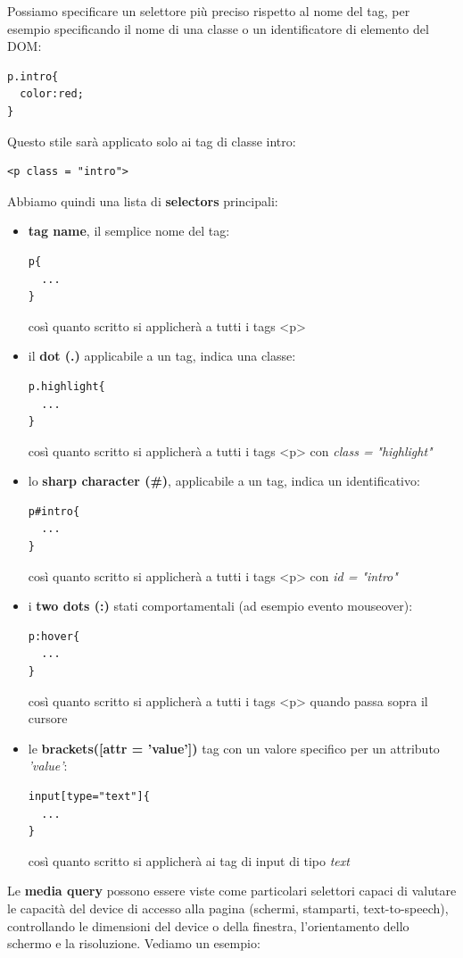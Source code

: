 \documentclass[a4paper,12pt, oneside]{book}
\begin{document}
\newpage
Possiamo specificare un selettore più preciso rispetto al
nome del tag, per esempio specificando il nome di una
classe o un identificatore di elemento del DOM:
\begin{verbatim}
p.intro{
  color:red;
}
\end{verbatim}
Questo stile sarà applicato solo ai tag di classe intro:
\begin{verbatim}
<p class = "intro">
\end{verbatim}
Abbiamo quindi una lista di \textbf{selectors} principali:
\begin{itemize}
	\item \textbf{tag name}, il semplice nome del tag:
	      \begin{verbatim}
p{
  ...
}
\end{verbatim}
	      così quanto scritto si applicherà a tutti i tags <p>
	\item il \textbf{dot (.)} applicabile a un tag, indica una classe:
	      \begin{verbatim}
p.highlight{
  ...
}
\end{verbatim}
	      così quanto scritto si applicherà a tutti i tags <p> con \textit{class =} \textit{"highlight"}
	\item lo \textbf{sharp character (\#)}, applicabile a un tag, indica un identificativo:
	      \begin{verbatim}
p#intro{
  ...
}
\end{verbatim}
	      così quanto scritto si applicherà a tutti i tags <p> con \textit{id = "intro"}
	\item i \textbf{two dots (:)} stati comportamentali (ad esempio evento mouseover):
	      \begin{verbatim}
p:hover{
  ...
}
\end{verbatim}
	      così quanto scritto si applicherà a tutti i tags <p> quando passa sopra il cursore
	\item le \textbf{brackets([attr = 'value'])} tag con un valore specifico per un attributo \textit{'value'}:
	      \begin{verbatim}
input[type="text"]{
  ...
}
\end{verbatim}
	      così quanto scritto si applicherà ai tag di input di tipo \textit{text}
\end{itemize}
Le \textbf{media query} possono essere viste come particolari selettori capaci di valutare le capacità del device di accesso alla pagina (schermi, stamparti, text-to-speech), controllando le dimensioni del device o della finestra, l'orientamento dello schermo e la risoluzione. Vediamo un esempio:\\
\end{document}
